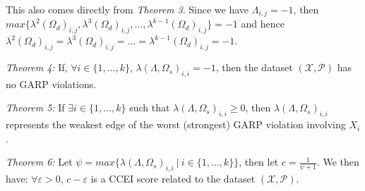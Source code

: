 \documentclass{article} %
\begin{document}
This also comes directly from \textit{Theorem 3}. Since we have $\Lambda_{i,j}=-1$, then $max\{\lambda^2(\Omega_d)_{i,j},\lambda^3(\Omega_d)_{i,j},\ldots,\lambda^{k-1}(\Omega_d)_{i,j}\}=-1$ and hence $\lambda^2(\Omega_d)_{i,j}=\lambda^3(\Omega_d)_{i,j}=\ldots=\lambda^{k-1}(\Omega_d)_{i,j}=-1$.

\textit{Theorem 4:} If, $\forall i\in\{1,\ldots,k\}$, $\lambda(\Lambda,\Omega_s)_{i,i}=-1$, then the dataset $(\mathcal{X},\mathcal{P})$ has no GARP violations. 

\textit{Theorem 5:} If $\exists i\in\{1,\ldots,k\}$ such that $\lambda(\Lambda,\Omega_s)_{i,i}\geq0$, then $\lambda(\Lambda,\Omega_s)_{i,i}$ represents the weakest edge of the worst (strongest) GARP violation involving $X_i$.

\textit{Theorem 6:} Let $\psi = max\big\{\lambda(\Lambda,\Omega_s)_{i,i}\ |\ i\in\{1,\ldots,k\}\big\}$, then let $c=\frac{1}{\psi+1}$. We then have: $\forall \varepsilon>0$, $c-\varepsilon$ is a CCEI score related to the dataset $(\mathcal{X},\mathcal{P})$.


\end{document}
